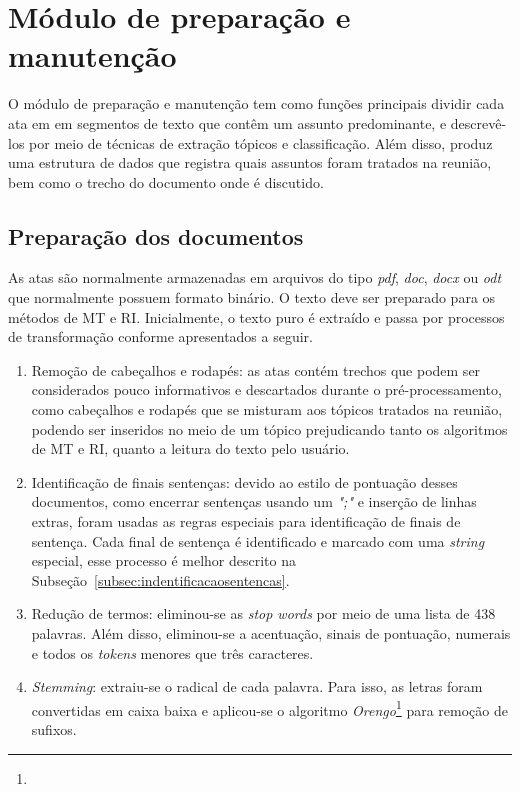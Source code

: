 \section{Módulo de preparação e manutenção}


O módulo de preparação e manutenção tem como funções principais dividir cada ata em em segmentos de texto que contêm um assunto predominante, e descrevê-los por meio de técnicas de extração tópicos e classificação. Além disso, produz uma estrutura de dados que registra quais assuntos foram tratados na reunião, bem como o trecho do documento onde é discutido.


\subsection{Preparação dos documentos}

As atas são normalmente armazenadas em arquivos do tipo \textit{pdf}, \textit{doc}, \textit{docx} ou \textit{odt} que normalmente possuem formato binário.
O texto deve ser preparado para os métodos de MT e RI. Inicialmente, o texto puro é extraído e passa por processos de transformação conforme apresentados a seguir.


\begin{enumerate}

\item Remoção de cabeçalhos e rodapés: as atas contém trechos que podem ser considerados pouco informativos e descartados durante o pré-processamento, como cabeçalhos e rodapés que se misturam aos tópicos tratados na reunião, podendo ser  inseridos no meio de um tópico prejudicando tanto os algoritmos de MT e RI, quanto a leitura do texto pelo usuário.

\item Identificação de finais sentenças: devido ao estilo de pontuação desses documentos, como encerrar sentenças usando um \textit{";"} e inserção de linhas extras, foram usadas as regras especiais para identificação de finais de sentença. Cada final de sentença é identificado e marcado com uma \textit{string} especial, esse processo é melhor descrito na Subseção~\ref{subsec:indentificacaosentencas}.



\item Redução de termos: eliminou-se as \textit{stop words} por meio de uma lista de 438 palavras. Além disso, eliminou-se a acentuação, sinais de pontuação, numerais e todos os \textit{tokens} menores que três caracteres. 

\item \textit{Stemming}: extraiu-se o radical de cada palavra. Para isso, as letras foram convertidas em caixa baixa e aplicou-se o algoritmo \textit{Orengo}\footnote{\urlorengo} para remoção de sufixos.

\end{enumerate}
	

